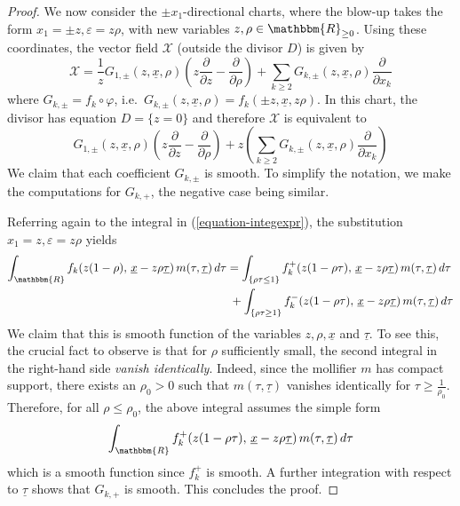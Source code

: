 \documentclass[11pt,psamsfonts]{article}
\theoremstyle{definition}
\theoremstyle{remark}
\newcommand{\cR}{\ensuremath{\mathbbm{R}}}
\newcommand{\eps}{\varepsilon }
\newcommand{\vf}{f}
\begin{document}
\begin{proof}
We now consider the $\pm x_1$-directional charts, where the blow-up takes the form $x_1 = \pm z, \eps= z \rho$, with new variables $z,\rho\in \cR_{\ge 0}$. Using these coordinates, the vector field $\mathcal{X}$ (outside the divisor $D$) is given by
\[
 \mathcal{X}= \frac{1}{z} G_{1,\pm} \left( z, \underline{x}, \rho
   \right) \left(z\frac{\partial}{\partial z}-\frac{\partial}{\partial \rho}\right) + \sum_{k \ge  2} G_{k,\pm} \left( z,
   \underline{x}, \rho \right) \frac{\partial}{\partial x_k} 
\]
where $G_{k,\pm}=f_k \circ \varphi$, i.e.\ $G_{k,\pm}( z,\underline{x}, \rho) = f_k(\pm z,\underline{x},z \rho)$.  
In this chart, the divisor has equation $D=\{ z = 0\}$ and therefore ${\mathcal{X}}$ is equivalent to 
$$
G_{1,\pm} \left( z, \underline{x}, \rho
   \right) \left(z\frac{\partial}{\partial z}-\frac{\partial}{\partial \rho}\right) + z \left( \sum_{k \ge  2} G_{k,\pm} \left( z,
   \underline{x}, \rho \right) \frac{\partial}{\partial x_k}  \right)
$$
We claim that each coefficient $G_{k,\pm}$ is smooth.  To simplify the notation, we make the computations for $G_{k,+}$, the negative case being similar.

Referring again to the integral in (\ref{equation-integexpr}), the substitution $x_1 = z, \eps= z \rho$ yields
\begin{align*}
\int_{\cR} 
   \vf_k\!\left( z(1-\rho), \, \underline{x} - z \rho \underline{\tau} \right) 
   m \!\left( \tau, \underline{\tau} \right) d\tau
   &= \int_{{\{ \rho \tau \le 1 \}}} 
        \vf_k^+ \!\left( z(1-\rho \tau), \, \underline{x} - z \rho \underline{\tau} \right) 
        m \!\left( \tau, \underline{\tau} \right) d\tau  \\
   &\; + \int_{{\{ \rho\tau  \ge 1 \}}} 
        \vf_k^- \!\left( z(1-\rho \tau), \, \underline{x} - z \rho \underline{\tau} \right) 
        m \!\left( \tau, \underline{\tau} \right) d\tau
\end{align*}
We claim that this is smooth function of the variables $z,\rho,\underline{x}$ and $\underline{\tau}$. To see this, the crucial fact to observe is that for $\rho$ sufficiently small, the second integral in the right-hand side {\em vanish identically}. Indeed, since the mollifier $m$ has compact support, there exists an $\rho_0 > 0$ such that $m(\tau,\underline{\tau})$ vanishes identically for $\tau \ge \frac{1}{\rho_0}$. Therefore, for all $\rho \le \rho_0$, the above integral assumes the simple form 
$$
\int_{{\cR}} 
        \vf_k^+ \!\left( z(1-\rho \tau), \, \underline{x} - z \rho \underline{\tau} \right) 
        m \!\left( \tau, \underline{\tau} \right) d\tau
$$
which is a smooth function since $\vf_k^+$ is smooth. 
A further integration with respect to $\underline{\tau}$ shows that $G_{k,+}$ is smooth. This concludes the proof. 
\end{proof}
\end{document}
